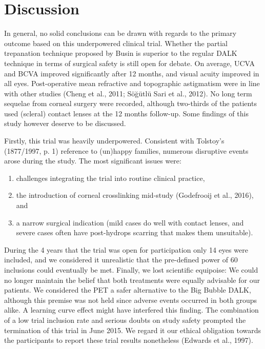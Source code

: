 \documentclass[authordate, empirical,issue]{jote-new-article}
\begin{document}
	\section{Discussion}



	In general, no solid conclusions can be drawn with regards to the primary outcome based on this underpowered clinical trial. Whether the partial trepanation technique proposed by Busin is superior to the regular DALK technique in terms of surgical safety is still open for debate. On average, UCVA and BCVA improved significantly after 12 months, and visual acuity improved in all eyes. Post-operative mean refractive and topographic astigmatism were in line with other studies (Cheng et al., 2011; Söğütlü Sari et al., 2012). No long term sequelae from corneal surgery were recorded, although two-thirds of the patients used (scleral) contact lenses at the 12 months follow-up. Some findings of this study however deserve to be discussed.



	Firstly, this trial was heavily underpowered. Consistent with Tolstoy's (1877/1997, p. 1) reference to (un)happy families, numerous disruptive events arose during the study. The most significant issues were:

	\begin{enumerate}


		\item challenges integrating the trial into routine clinical practice,



		\item
		the introduction of corneal crosslinking mid-study (Godefrooij et al., 2016), and



		\item a narrow surgical indication (mild cases do well with contact lenses, and severe cases often have post-hydrops scarring that makes them unsuitable).


	\end{enumerate}

	During the 4 years that the trial was open for participation only 14 eyes were included, and we considered it unrealistic that the pre-defined power of 60 inclusions could eventually be met. Finally, we lost scientific equipoise: We could no longer maintain the belief that both treatments were equally advisable for our patients. We considered the PET a safer alternative to the Big Bubble DALK, although this premise was not held since adverse events occurred in both groups alike. A learning curve effect might have interfered this finding. The combination of a low trial inclusion rate and serious doubts on study safety prompted the termination of this trial in June 2015. We regard it our ethical obligation towards the participants to report these trial results nonetheless (Edwards et al., 1997).
\end{document}
